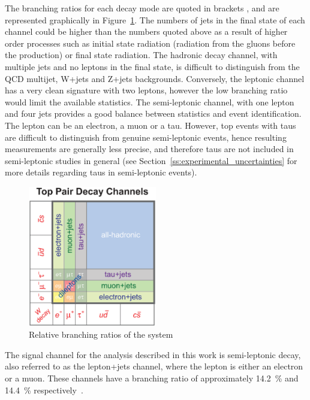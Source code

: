 The branching ratios for each decay mode are quoted in brackets \cite{Agashe:2014kda}, and are represented
graphically in Figure~\ref{fig:ttbar_branching_ratios}. The numbers of jets in the final state of each channel
could be higher than the numbers quoted above as a result of higher order processes such as initial state
radiation (radiation from the gluons before the \ttbar production) or final state radiation. The hadronic
decay channel, with multiple jets and no leptons in the final state, is difficult to distinguish from the QCD
multijet, W+jets and Z+jets backgrounds. Conversely, the leptonic channel has a very clean signature with two
leptons, however the low branching ratio would limit the available statistics. The semi-leptonic channel, with
one lepton and four jets provides a good balance between statistics and event identification. The lepton can
be an electron, a muon or a tau. However, top events with taus are difficult to distinguish from genuine
semi-leptonic events, hence resulting measurements are generally less precise, and therefore taus are not
included in semi-leptonic \tquark studies in general (see Section~\ref{ss:experimental_uncertainties} for more
details regarding taus in semi-leptonic \ttbar events).

\begin{figure}[hbtp]
   \centering
     \includegraphics[width=0.5\textwidth]{Chapters/03_Theory/Images/top_pair_decay_channels}\hfill
     \caption[Relative branching ratios of the \ttbar system]{Relative branching ratios of the \ttbar system}
     \label{fig:ttbar_branching_ratios}
\end{figure}

The signal channel for the analysis described in this work is semi-leptonic \ttbar decay, also referred to as
the lepton+jets channel, where the lepton is either an electron or a muon. These channels have a branching
ratio of approximately 14.2~\% and 14.4~\% respectively~\cite{Agashe:2014kda}.

